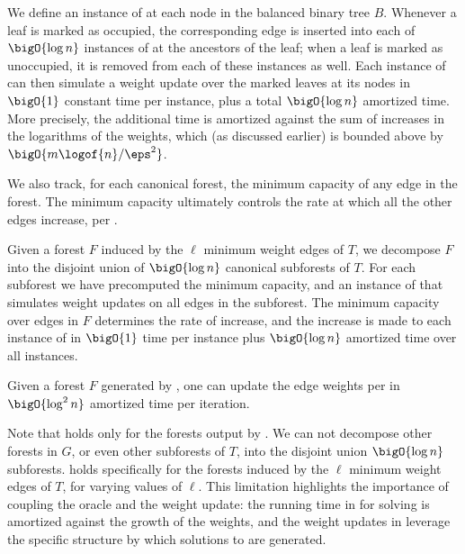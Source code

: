 \documentclass{toc}
\begin{document}
We define an instance of  at each node in the
balanced binary tree $B$. Whenever a leaf is marked as occupied, the
corresponding edge is inserted into each of $\bigO{\log n}$ instances
of  at the ancestors of the leaf; when a leaf is
marked as unoccupied, it is removed from each of these instances as
well. Each instance of  can then simulate a
weight update over the marked leaves at its nodes in $\bigO{1}$
constant time per instance, plus a total $\bigO{\log n}$ amortized
time. More precisely, the additional time is amortized against the sum
of increases in the logarithms of the weights, which (as discussed
earlier) is bounded above by $\bigO{m \logof{n} / \eps^2}$.

We also track, for each canonical forest, the minimum capacity of any
edge in the forest. The minimum capacity ultimately controls the rate
at which all the other edges increase, per
.

Given a forest $F$ induced by the $\ell$ minimum weight edges of $T$,
we decompose $F$ into the disjoint union of $\bigO{\log n}$ canonical
subforests of $T$. For each subforest we have precomputed the minimum
capacity, and an instance of  that simulates
weight updates on all edges in the subforest. The minimum capacity
over edges in $F$ determines the rate of increase, and the increase is
made to each instance of  in $\bigO{1}$ time per
instance plus $\bigO{\log n}$ amortized time over all instances.

\begin{lemma}
   Given a forest $F$ generated by
  , one can update the edge weights per
   in $\bigO{\log^2 n}$
  amortized time per iteration.
\end{lemma}


Note that  holds only for the forests
output by . We can not decompose other
forests in $G$, or even other subforests of $T$, into the disjoint
union $\bigO{\log n}$ subforests. 
holds specifically for the forests induced by the $\ell$ minimum
weight edges of $T$, for varying values of $\ell$. This limitation
highlights the importance of coupling the oracle and the weight
update: the running time in  for solving
 is amortized against the growth of the
weights, and the weight updates in 
leverage the specific structure by which solutions to
 are generated.
\end{document}
